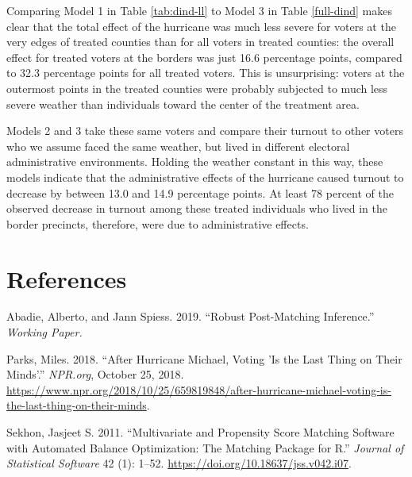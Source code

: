 \documentclass[
  12pt,
]{article}
\newlength{\cslhangindent}
\newenvironment{cslreferences}%
  {\setlength{\parindent}{0pt}%
  \everypar{\setlength{\hangindent}{\cslhangindent}}\ignorespaces}%
  {\par}
\begin{document}
Comparing Model 1 in Table \ref{tab:dind-ll} to Model 3 in Table \ref{full-dind} makes clear that the total effect of the hurricane was much less severe for voters at the very edges of treated counties than for all voters in treated counties: the overall effect for treated voters at the borders was just 16.6 percentage points, compared to 32.3 percentage points for all treated voters. This is unsurprising: voters at the outermost points in the treated counties were probably subjected to much less severe weather than individuals toward the center of the treatment area.

Models 2 and 3 take these same voters and compare their turnout to other voters who we assume faced the same weather, but lived in different electoral administrative environments. Holding the weather constant in this way, these models indicate that the administrative effects of the hurricane caused turnout to decrease by between 13.0 and 14.9 percentage points. At least 78 percent of the observed decrease in turnout among these treated individuals who lived in the border precincts, therefore, were due to administrative effects.

\newpage

\hypertarget{references}{%
\section*{References}\label{references}}

\hypertarget{refs}{}
\begin{cslreferences}
\leavevmode\hypertarget{ref-Abadie2019}{}%
Abadie, Alberto, and Jann Spiess. 2019. ``Robust Post-Matching Inference.'' \emph{Working Paper.}

\leavevmode\hypertarget{ref-Parks2018}{}%
Parks, Miles. 2018. ``After Hurricane Michael, Voting 'Is the Last Thing on Their Minds'.'' \emph{NPR.org}, October 25, 2018. \url{https://www.npr.org/2018/10/25/659819848/after-hurricane-michael-voting-is-the-last-thing-on-their-minds}.

\leavevmode\hypertarget{ref-Sekhon2011}{}%
Sekhon, Jasjeet S. 2011. ``Multivariate and Propensity Score Matching Software with Automated Balance Optimization: The Matching Package for R.'' \emph{Journal of Statistical Software} 42 (1): 1--52. \url{https://doi.org/10.18637/jss.v042.i07}.
\end{cslreferences}
\end{document}
